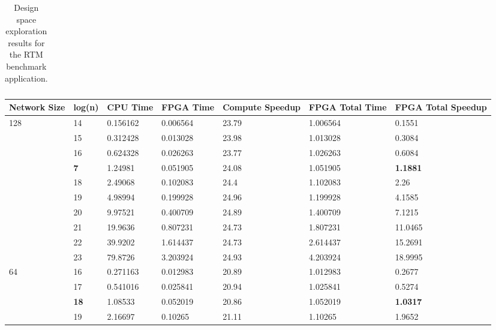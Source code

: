 \begin{sidewaystable}
\begin{tabularx}{\textheight}{p{3.5cm}|X|X|X|X|X|X|X|X|X|X|X|X|p{1cm}|}
    \end{tabularx}
    \caption{Design space exploration results for the RTM benchmark application.}
    \label{table:rtm-dse}
  \end{sidewaystable}

\begin{table}
  \renewcommand{\arraystretch}{1.1}
  \begin{tabularx}{\textwidth}{X|X|X|X|X|X|X}
    \hline
    Network Size        & log(n)      & CPU Time & FPGA Time & Compute Speedup & FPGA Total Time & FPGA Total Speedup \\
    \hline \hline
    \multirow{10}{*}{128}   & 14          & 0.156162 & 0.006564  & 23.79           & 1.006564        & 0.1551             \\
    & 15          & 0.312428 & 0.013028  & 23.98           & 1.013028        & 0.3084             \\
    & 16          & 0.624328 & 0.026263  & 23.77           & 1.026263        & 0.6084             \\
    & \textbf{7}  & 1.24981  & 0.051905  & 24.08           & 1.051905        & \textbf{1.1881}    \\
    & 18          & 2.49068  & 0.102083  & 24.4            & 1.102083        & 2.26               \\
    & 19          & 4.98994  & 0.199928  & 24.96           & 1.199928        & 4.1585             \\
    & 20          & 9.97521  & 0.400709  & 24.89           & 1.400709        & 7.1215             \\
    & 21          & 19.9636  & 0.807231  & 24.73           & 1.807231        & 11.0465            \\
    & 22          & 39.9202  & 1.614437  & 24.73           & 2.614437        & 15.2691            \\
    & 23          & 79.8726  & 3.203924  & 24.93           & 4.203924        & 18.9995            \\
    \hline
    \multirow{8}{*}{64} & 16          & 0.271163 & 0.012983  & 20.89           & 1.012983        & 0.2677             \\
    & 17          & 0.541016 & 0.025841  & 20.94           & 1.025841        & 0.5274             \\
    & \textbf{18} & 1.08533  & 0.052019  & 20.86           & 1.052019        & \textbf{1.0317}    \\
    & 19          & 2.16697  & 0.10265   & 21.11           & 1.10265         & 1.9652             \\

\end{tabularx}
\end{table}
